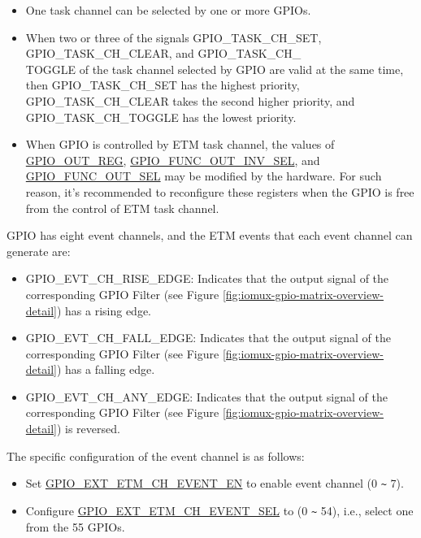 \documentclass[main\_\_EN.tex]{subfiles}
\begin{document}
\begin{tiplisting}
\vspace{-2em}
\begin{itemize}
\item One task channel can be selected by one or more GPIOs.

\item When two or three of the signals GPIO\_TASK\_CH\_SET, GPIO\_TASK\_CH\_CLEAR, and GPIO\_TASK\_CH\_\\TOGGLE of the task channel   selected by GPIO are valid at the same time, then GPIO\_TASK\_CH\_SET has the highest priority, GPIO\_TASK\_CH\_CLEAR takes the second higher priority, and GPIO\_TASK\_CH\_TOGGLE has the lowest priority.

\item When GPIO is controlled by ETM task channel, the values of \hyperref[regdesc:GPIOOUTREG]{GPIO\_OUT\_REG}, \hyperref[fielddesc:GPIOFUNCNOUTINVSEL]{GPIO\_FUNC\_OUT\_INV\_SEL}, and \hyperref[fielddesc:GPIOFUNCNOUTSEL]{GPIO\_FUNC\_OUT\_SEL} may be modified by the hardware. For such reason, it's recommended to reconfigure these registers when the GPIO is free from the control of ETM task channel.
\end{itemize}
\end{tiplisting}

GPIO has eight event channels, and the ETM events that each event channel can generate are:

\begin{itemize}
    \item GPIO\_EVT\_CH\_RISE\_EDGE: Indicates that the output signal of the corresponding GPIO Filter (see Figure \ref{fig:iomux-gpio-matrix-overview-detail}) has a rising edge.
    \item GPIO\_EVT\_CH\_FALL\_EDGE: Indicates that the output signal of the corresponding GPIO Filter (see Figure \ref{fig:iomux-gpio-matrix-overview-detail}) has a falling edge.
    \item GPIO\_EVT\_CH\_ANY\_EDGE: Indicates that the output signal of the corresponding GPIO Filter (see Figure \ref{fig:iomux-gpio-matrix-overview-detail}) is reversed.
\end{itemize}

The specific configuration of the event channel is as follows:

\begin{itemize}
    \item Set  \hyperref[fielddesc:GPIOSDETMCH0EVENTEN]{GPIO\_EXT\_ETM\_CH\_EVENT\_EN} to enable event channel  (0 \verb+~+ 7).
    \item Configure \hyperref[fielddesc:GPIOSDETMCH0EVENTSEL]{GPIO\_EXT\_ETM\_CH\_EVENT\_SEL} to  (0 \verb+~+ 54), i.e., select one from the 55 GPIOs.
\end{itemize}
\end{document}
